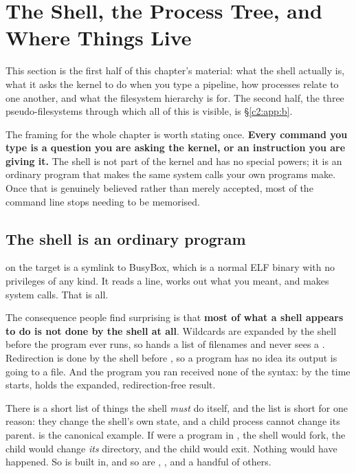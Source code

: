 
\section{The Shell, the Process Tree, and Where Things Live}
\label{c2:app:a}

This section is the first half of this chapter's material: what the shell actually is, what
it asks the kernel to do when you type a pipeline, how processes relate to one another, and what the
filesystem hierarchy is for. The second half, the three pseudo-filesystems through which all of this
is visible, is \S\ref{c2:app:b}.

The framing for the whole chapter is worth stating once. \textbf{Every command you type is a
question you are asking the kernel, or an instruction you are giving it.} The shell is not part of
the kernel and has no special powers; it is an ordinary program that makes the same system calls
your own programs make. Once that is genuinely believed rather than merely accepted, most of the
command line stops needing to be memorised.

\subsection{The shell is an ordinary program}
\label{c2:app:a1}

 on the target is a symlink to BusyBox, which is a normal ELF binary with no
privileges of any kind. It reads a line, works out what you meant, and makes system calls. That is
all.

The consequence people find surprising is that \textbf{most of what a shell appears to do is not
done by the shell at all}. Wildcards are expanded by the shell before the program ever runs, so
 hands  a list of filenames and  never sees a \code{*}. Redirection is
done by the shell before , so a program has no idea its output is going to a file. And
the program you ran received none of the syntax: by the time  starts,  holds
the expanded, redirection-free result.

There is a short list of things the shell \emph{must} do itself, and the list is short for one
reason: they change the shell's own state, and a child process cannot change its parent. 
is the canonical example. If  were a program in , the shell would fork, the
child would change \emph{its} directory, and the child would exit. Nothing would have happened. So
 is built in, and so are , ,  and a handful of others.

